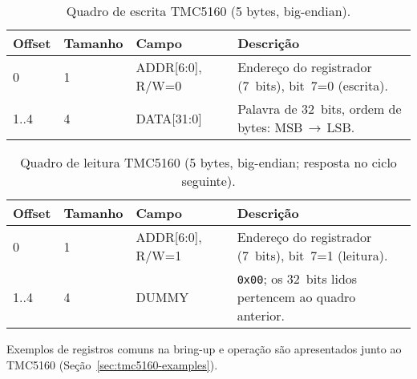 \begin{table}[h]
  \centering
  \caption{Quadro de escrita TMC5160 (5 bytes, big-endian).}
  \label{tab:tmc5160-write}
  \setlength{\tabcolsep}{4pt}\footnotesize
  \begin{tabularx}{\textwidth}{lllX}
    \toprule
    Offset & Tamanho & Campo & Descri\c{c}\~ao \\
    \midrule
    0 & 1 & ADDR[6:0], R/W=0 & Endere\c{c}o do registrador (7~bits), bit~7=0 (escrita). \\
    1..4 & 4 & DATA[31:0] & Palavra de 32~bits, ordem de bytes: MSB\,$\to$\,LSB. \\
    \bottomrule
  \end{tabularx}
\end{table}

\begin{table}[h]
  \centering
  \caption{Quadro de leitura TMC5160 (5 bytes, big-endian; resposta no ciclo seguinte).}
  \label{tab:tmc5160-read}
  \setlength{\tabcolsep}{4pt}\footnotesize
  \begin{tabularx}{\textwidth}{lllX}
    \toprule
    Offset & Tamanho & Campo & Descri\c{c}\~ao \\
    \midrule
    0 & 1 & ADDR[6:0], R/W=1 & Endere\c{c}o do registrador (7~bits), bit~7=1 (leitura). \\
    1..4 & 4 & DUMMY & \texttt{0x00}; os 32~bits lidos pertencem ao quadro anterior. \\
    \bottomrule
  \end{tabularx}
\end{table}

\noindent Exemplos de registros comuns na bring-up e opera\c{c}\~ao s\~ao apresentados junto ao TMC5160 (Se\c{c}\~ao~\ref{sec:tmc5160-examples}).
